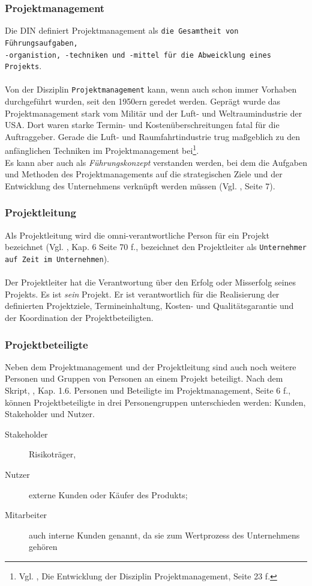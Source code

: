 \documentclass[11pt]{scrartcl}
\begin{document}
\subsubsection{Projektmanagement}
Die DIN definiert Projektmanagement als \texttt{die Gesamtheit von Führungsaufgaben,\\ -organistion, -techniken und -mittel für die Abweicklung eines Projekts}.\\
\\
Von der Disziplin \texttt{Projektmanagement} kann, wenn auch schon immer Vorhaben durchgeführt wurden, seit den 1950ern geredet werden. Geprägt wurde das Projektmanagement stark vom Militär und der Luft- und Weltraumindustrie der USA. Dort waren starke Termin- und Kostenüberschreitungen fatal für die Auftraggeber. Gerade die Luft- und Raumfahrtindustrie trug maßgeblich zu den anfänglichen Techniken im Projektmanagement bei\footnote{Vgl. \cite{proj_zum_erfolg_fuehren}, Die Entwicklung der Disziplin Projektmanagement, Seite 23 f.}. 
\\
Es kann aber auch als \textit{Führungskonzept} verstanden werden, bei dem die Aufgaben und Methoden des Projektmanagements auf die strategischen Ziele und der Entwicklung des Unternehmens verknüpft werden müssen (Vgl. \cite{scriptPM}, Seite 7). 

\subsubsection{Projektleitung}
Als Projektleitung wird die omni-verantwortliche Person für ein Projekt bezeichnet (Vgl. \cite{proj_zum_erfolg_fuehren}, Kap. 6 Seite 70 f., bezeichnet den Projektleiter als \texttt{Unternehmer auf Zeit im Unternehmen}). \\
\\
Der Projektleiter hat die Verantwortung über den Erfolg oder Misserfolg seines Projekts. Es ist \textit{sein} Projekt. Er ist verantwortlich für die Realisierung der definierten Projektziele, Termineinhaltung, Kosten- und Qualitätsgarantie und der Koordination der Projektbeteiligten. 

\subsubsection{Projektbeteiligte}
\label{proj_beteiligte}
Neben dem Projektmanagement und der Projektleitung sind auch noch weitere Personen und Gruppen von Personen an einem Projekt beteiligt. Nach dem Skript, \cite{scriptPM}, Kap. 1.6. Personen und Beteiligte im Projektmanagement, Seite 6 f., können Projektbeteiligte in drei Personengruppen unterschieden werden: Kunden, Stakeholder und Nutzer.
\begin{description}
    \item[Stakeholder]
    Risikoträger, 
        
    \item[Nutzer]
    externe Kunden oder Käufer des Produkts;
    
    \item[Mitarbeiter]
    auch interne Kunden genannt, da sie zum Wertprozess des Unternehmens gehören    
\end{description}
\end{document}
